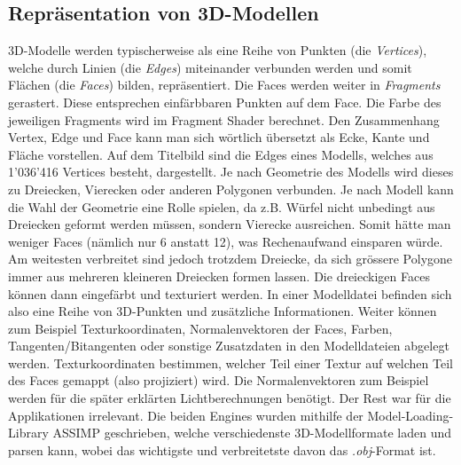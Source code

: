 \documentclass[titlepage, 11pt, a4paper, ngerman]{article}
\begin{document}
\subsection{Repräsentation von 3D-Modellen}
3D-Modelle werden typischerweise als eine Reihe von Punkten (die \textit{\gls{Vertices}}), welche durch Linien (die \textit{\glspl{Edge}}) miteinander verbunden werden und somit Flächen (die \textit{\glspl{Face}}) bilden, repräsentiert. Die Faces werden weiter in \textit{\glspl{Fragment}} gerastert. Diese entsprechen einfärbbaren Punkten auf dem Face. Die Farbe des jeweiligen \gls{Fragment}s wird im \gls{Fragment} \gls{Shader} berechnet. Den Zusammenhang \gls{Vertex}, \gls{Edge} und \gls{Face} kann man sich wörtlich übersetzt als Ecke, Kante und Fläche vorstellen. Auf dem Titelbild sind die Edges eines Modells, welches aus 1'036'416 Vertices besteht, dargestellt. Je nach Geometrie des Modells wird dieses zu Dreiecken, Vierecken oder anderen Polygonen verbunden. Je nach Modell kann die Wahl der Geometrie eine Rolle spielen, da z.B. Würfel nicht unbedingt aus Dreiecken geformt werden müssen, sondern Vierecke ausreichen. Somit hätte man weniger Faces (nämlich nur 6 anstatt 12), was Rechenaufwand einsparen würde. Am weitesten verbreitet sind jedoch trotzdem Dreiecke, da sich grössere Polygone immer aus mehreren kleineren Dreiecken formen lassen. Die dreieckigen \glspl{Face} können dann eingefärbt und texturiert werden. In einer Modelldatei befinden sich also eine Reihe von 3D-Punkten und zusätzliche Informationen. Weiter können zum Beispiel Texturkoordinaten, Normalenvektoren der \glspl{Face}, Farben, Tangenten/Bitangenten oder sonstige Zusatzdaten in den Modelldateien abgelegt werden. Texturkoordinaten bestimmen, welcher Teil einer Textur auf welchen Teil des \glspl{Face} gemappt (also projiziert) wird. Die Normalenvektoren zum Beispiel werden für die später erklärten Lichtberechnungen benötigt. Der Rest war für die Applikationen irrelevant. Die beiden \glspl{Engine} wurden mithilfe der Model-Loading-Library \acrshort{ASSIMP} geschrieben, welche verschiedenste 3D-Modellformate laden und parsen kann, wobei das wichtigste und verbreitetste davon das \textit{.obj}-Format ist.
\end{document}
